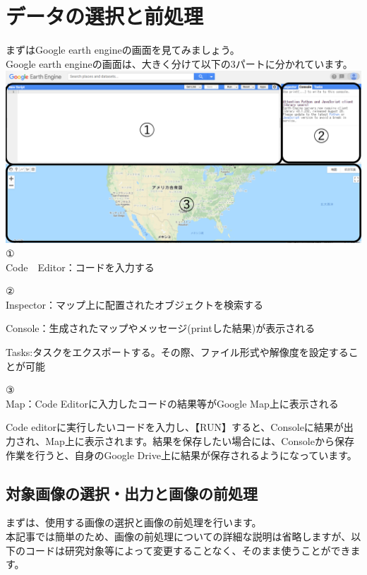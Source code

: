 \documentclass[
]{book}
\begin{document}
\hypertarget{ux30c7ux30fcux30bfux306eux9078ux629eux3068ux524dux51e6ux7406}{%
\chapter{データの選択と前処理}\label{ux30c7ux30fcux30bfux306eux9078ux629eux3068ux524dux51e6ux7406}}

まずはGoogle earth engineの画面を見てみましょう。\\
Google earth engineの画面は、大きく分けて以下の3パートに分かれています。
\includegraphics{images/GEE.png}
①\\
Code　Editor：コードを入力する

②\\
Inspector：マップ上に配置されたオブジェクトを検索する

Console：生成されたマップやメッセージ(printした結果)が表示される

Tasks:タスクをエクスポートする。その際、ファイル形式や解像度を設定することが可能

③\\
Map：Code Editorに入力したコードの結果等がGoogle Map上に表示される

Code editorに実行したいコードを入力し、【RUN】すると、Consoleに結果が出力され、Map上に表示されます。結果を保存したい場合には、Consoleから保存作業を行うと、自身のGoogle Drive上に結果が保存されるようになっています。

\hypertarget{ux5bfeux8c61ux753bux50cfux306eux9078ux629eux51faux529bux3068ux753bux50cfux306eux524dux51e6ux7406}{%
\section{対象画像の選択・出力と画像の前処理}\label{ux5bfeux8c61ux753bux50cfux306eux9078ux629eux51faux529bux3068ux753bux50cfux306eux524dux51e6ux7406}}

まずは、使用する画像の選択と画像の前処理を行います。\\
本記事では簡単のため、画像の前処理についての詳細な説明は省略しますが、以下のコードは研究対象等によって変更することなく、そのまま使うことができます。
\end{document}
